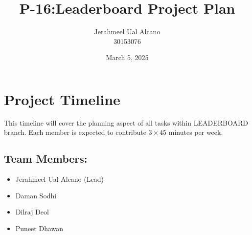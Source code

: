 \documentclass{report}
\title{\huge{P-16:}Leaderboard Project Plan}
\author{Jerahmeel Ual Alcano \\ 30153076}
\date{March 5, 2025}
\begin{document}
\maketitle
\section*{Project Timeline}
This timeline will cover the planning aspect of all tasks within LEADERBOARD branch. Each member is expected to contribute \(3\times45\) minutes per week.
\subsection*{Team Members:}
\begin{itemize}
    \item Jerahmeel Ual Alcano (Lead)
    \item Daman Sodhi
    \item Dilraj Deol
    \item Puneet Dhawan
\end{itemize}
\end{document}
